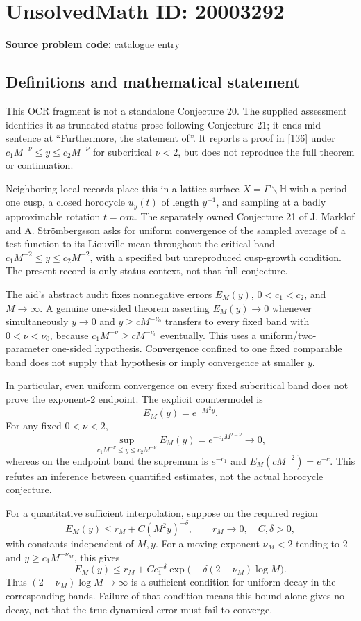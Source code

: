\documentclass[11pt]{article}
\begin{document}
\section*{UnsolvedMath ID: 20003292}
\textbf{Source problem code:} catalogue entry
\subsection{Definitions and mathematical statement}
This OCR fragment is not a standalone Conjecture 20. The supplied assessment identifies it as truncated status prose following Conjecture 21; it ends mid-sentence at ``Furthermore, the statement of''. It reports a proof in [136] under $c_1M^{-\nu}\leq y\leq c_2M^{-\nu}$ for subcritical $\nu<2$, but does not reproduce the full theorem or continuation.

Neighboring local records place this in a lattice surface $X=\Gamma\backslash\mathbb H$ with a period-one cusp, a closed horocycle $u_y(t)$ of length $y^{-1}$, and sampling at a badly approximable rotation $t=\alpha m$. The separately owned Conjecture 21 of J. Marklof and A. Str\"ombergsson asks for uniform convergence of the sampled average of a test function to its Liouville mean throughout the critical band $c_1M^{-2}\leq y\leq c_2M^{-2}$, with a specified but unreproduced cusp-growth condition. The present record is only status context, not that full conjecture.

The aid's abstract audit fixes nonnegative errors $E_M(y)$, $0<c_1<c_2$, and $M\to\infty$. A genuine one-sided theorem asserting $E_M(y)\to0$ whenever simultaneously $y\to0$ and $y\geq cM^{-\nu_0}$ transfers to every fixed band with $0<\nu<\nu_0$, because $c_1M^{-\nu}\geq cM^{-\nu_0}$ eventually. This uses a uniform/two-parameter one-sided hypothesis. Convergence confined to one fixed comparable band does not supply that hypothesis or imply convergence at smaller $y$.

In particular, even uniform convergence on every fixed subcritical band does not prove the exponent-$2$ endpoint. The explicit countermodel is
\[
 E_M(y)=e^{-M^2y}.
\]
For any fixed $0<\nu<2$,
\[
 \sup_{c_1M^{-\nu}\leq y\leq c_2M^{-\nu}}E_M(y)
       =e^{-c_1M^{2-\nu}}\longrightarrow0,
\]
whereas on the endpoint band the supremum is $e^{-c_1}$ and $E_M(cM^{-2})=e^{-c}$. This refutes an inference between quantified estimates, not the actual horocycle conjecture.

For a quantitative sufficient interpolation, suppose on the required region
\[
 E_M(y)\leq r_M+C(M^2y)^{-\delta},\qquad
 r_M\to0,\quad C,\delta>0,
\]
with constants independent of $M,y$. For a moving exponent $\nu_M<2$ tending to $2$ and $y\geq c_1M^{-\nu_M}$, this gives
\[
 E_M(y)\leq r_M+C c_1^{-\delta}
   \exp\bigl(-\delta(2-\nu_M)\log M\bigr).
\]
Thus $(2-\nu_M)\log M\to\infty$ is a sufficient condition for uniform decay in the corresponding bands. Failure of that condition means this bound alone gives no decay, not that the true dynamical error must fail to converge.
\end{document}
